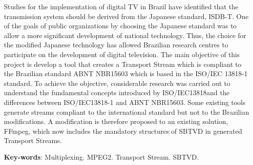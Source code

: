 \documentclass[
	12pt,				%
	openright,			%
	twoside,			%
	a4paper,			%
	brazil,
	french,				%
	english
	]{abntex2}
\begin{document}
\begin{resumo}[Abstract]

Studies for the implementation of digital TV in Brazil have identified that the transmission system should be derived from the Japanese standard, ISDB-T. One of the goals of public organizations by choosing the Japanese standard was to allow a more significant development of national technology. Thus, the choice for the modified Japanese technology has allowed Brazilian research centres to participate on the development of digital television. The main objective of this project is develop a tool that creates a Transport Stream which is compliant to the Brazilian standard ABNT NBR15603 which is based in the ISO/IEC 13818-1 standard. To achieve the objective, considerable research was carried out to understand the fundamental concepts introduced by ISO/IEC13818and the differences between ISO/IEC13818-1 and ABNT NBR15603. Some existing tools generate streams compliant to the international standard but not to the Brazilian modifications. A modification is therefore proposed to an existing solution, FFmpeg, which now includes the mandatory structures of SBTVD in generated Transport Streams.

   \vspace{\onelineskip}
 
   \noindent 
   \textbf{Key-words}: Multiplexing. MPEG2. Transport Stream. SBTVD.
 
\end{resumo}

 

\end{document}
